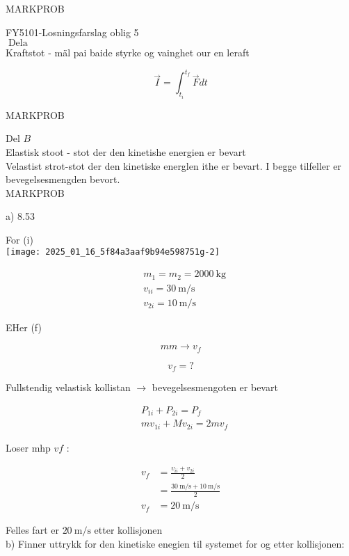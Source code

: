 \documentclass[10pt]{article}
\begin{document}
MARKPROB

FY5101-Losningsfarslag oblig 5\\
$\operatorname{Dela}$\\
Kraftstot - mäl pai baide styrke og vainghet our en leraft

$$
\vec{I}=\int_{t_{i}}^{t_{f}} \vec{F} d t
$$

MARKPROB

Del $B$\\
Elastisk stoot - stot der den kinetishe energien er bevart\\
Velastist strot-stot der den kinetiske energlen ithe er bevart. I begge tilfeller er bevegelsesmengden bevort.\\

MARKPROB

a) 8.53

For (i)\\
\texttt{[image: 2025\_01\_16\_5f84a3aaf9b94e598751g-2]}

$$
\begin{aligned}
& m_{1}=m_{2}=2000 \mathrm{~kg} \\
& v_{i i}=30 \mathrm{~m} / \mathrm{s} \\
& v_{2 i}=10 \mathrm{~m} / \mathrm{s}
\end{aligned}
$$

EHer (f)

$$
m m \rightarrow v_{f}
$$

$$
v_{f}=?
$$

Fullstendig velastisk kollistan $\rightarrow$ bevegelsesmengoten er bevart

$$
\begin{aligned}
& P_{1 i}+P_{2 i}=P_{f} \\
& m v_{1 i}+M v_{2 i}=2 m v_{f}
\end{aligned}
$$

Loser mhp $v f$ :

$$
\begin{aligned}
v_{f} & =\frac{v_{i i}+v_{2 i}}{2} \\
& =\frac{30 \mathrm{~m} / \mathrm{s}+10 \mathrm{~m} / \mathrm{s}}{2} \\
v_{f} & =20 \mathrm{~m} / \mathrm{s}
\end{aligned}
$$

Felles fart er $20 \mathrm{~m} / \mathrm{s}$ etter kollisjonen\\
b) Finner uttrykk for den kinetiske enegien til systemet for og etter kollisjonen:
\end{document}
